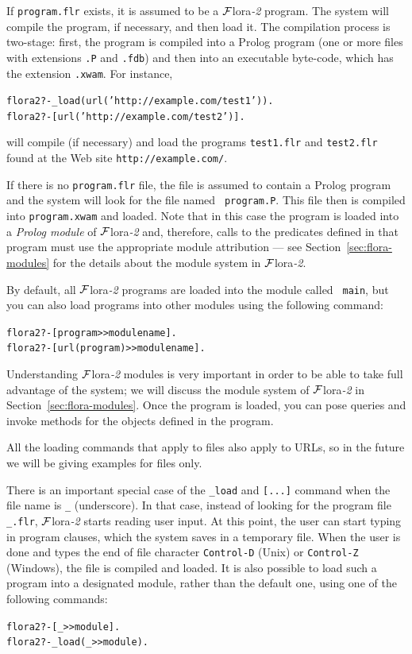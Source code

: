\documentclass[11pt]{article}
\newcommand{\FLORA}{{\mbox{\sc ${\cal F}${lora}\rm\emph{-2}}}\xspace}
\newcommand{\ofile}{xwam}
\begin{document}
If {\tt program.flr} exists, it is assumed to be a \FLORA program. The
system will compile the program, if necessary, and then load it. The
compilation process is two-stage: first, the program is compiled into a
Prolog program (one or more files with extensions {\tt .P} and {\tt .fdb})
and then into an executable byte-code, which has the extension {\tt .\ofile}.
For instance, 
\begin{alltt}
  flora2 ?- _load(url('http://example.com/test1')).
  flora2 ?- [url('http://example.com/test2')].
\end{alltt}
will compile (if necessary) and load the programs {\tt test1.flr} and
{\tt test2.flr} found at the Web site {\tt http://example.com/}.   

If there is no {\tt program.flr} file, the file is assumed to contain
a Prolog program and the system will look for the file named {\tt
  program.P}. This file then is compiled into {\tt program.\ofile} and
loaded. Note that in this case the program is loaded into a {\em Prolog
  module} of \FLORA and, therefore, calls to the predicates defined in that
program must use the appropriate module attribution --- see
Section~\ref{sec:flora-modules} for the details about the module system in
\FLORA.

By default, all \FLORA programs are loaded into the module called {\tt
  main}, but you can also load programs into other modules using the following
command:
\begin{alltt}
  flora2 ?-  [program>>modulename].
  flora2 ?-  [url(program)>>modulename].
\end{alltt}
Understanding \FLORA modules is very important in order to be able to take
full advantage of the system; we will discuss the module system of \FLORA
in Section~\ref{sec:flora-modules}.  Once the program is loaded, you can
pose queries and invoke methods for the objects defined in the program.

All the loading commands that apply to files also apply to URLs, so in the
future we will be giving examples for files only.

There is an important special case of the {\tt \_load} and {\tt [...]}
command when the file name is {\tt \_} (underscore). In that case, instead
of looking for the program file {\tt \_.flr}, \FLORA starts reading user
input. At this point, the user can start typing in program clauses, which
the system saves in a temporary file. When the user is done and types the
end of file character {\tt Control-D} (Unix) or {\tt Control-Z} (Windows),
the file is compiled and loaded. It is also possible to load such a program
into a designated module, rather than the default one, using one of the
following commands:
\begin{alltt}
  flora2 ?- [_>>module].
  flora2 ?- _load(_>>module).
\end{alltt}
\end{document}
